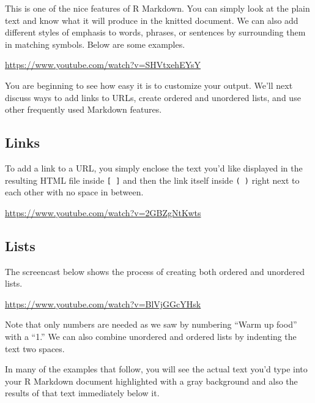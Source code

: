 \documentclass[]{tufte-book}
\begin{document}
This is one of the nice features of R Markdown. You can simply look at the plain text and know what it will produce in the knitted document. We can also add different styles of emphasis to words, phrases, or sentences by surrounding them in matching symbols. Below are some examples.

\vspace{0.1in}\begin{center}\footnotesize{\url{https://www.youtube.com/watch?v=SHVtxehEYsY}}\end{center}\vspace{0.1in}

You are beginning to see how easy it is to customize your output. We'll next discuss ways to add links to URLs, create ordered and unordered lists, and use other frequently used Markdown features.

\subsection{Links}\label{links}

To add a link to a URL, you simply enclose the text you'd like displayed in the resulting HTML file inside \texttt{{[}\ {]}} and then the link itself inside \texttt{(\ )} right next to each other with no space in between.

\vspace{0.1in}\begin{center}\footnotesize{\url{https://www.youtube.com/watch?v=2GBZgNtKwts}}\end{center}\vspace{0.1in}

\subsection{Lists}\label{lists}

The screencast below shows the process of creating both ordered and unordered lists.

\vspace{0.1in}\begin{center}\footnotesize{\url{https://www.youtube.com/watch?v=BlVjGGcYHsk}}\end{center}\vspace{0.1in}

Note that only numbers are needed as we saw by numbering ``Warm up food'' with a ``1.'' We can also combine unordered and ordered lists by indenting the text two spaces.

In many of the examples that follow, you will see the actual text you'd type into your R Markdown document highlighted with a gray background and also the results of that text immediately below it.
\end{document}
